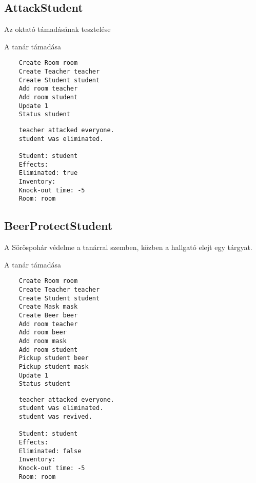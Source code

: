 \subsection{AttackStudent}
\begin{test-case-description}
    Az oktató támadásának tesztelése
\end{test-case-description}
\begin{test-case-function}
    A tanár támadása
\end{test-case-function}
\begin{test-case-input}
    \begin{verbatim}
    Create Room room
    Create Teacher teacher
    Create Student student
    Add room teacher
    Add room student
    Update 1
    Status student
    \end{verbatim}
\end{test-case-input}
\begin{test-case-output}
    \begin{verbatim}
    teacher attacked everyone.
    student was eliminated.
    
    Student: student
    Effects: 
    Eliminated: true
    Inventory: 
    Knock-out time: -5
    Room: room
    \end{verbatim}
\end{test-case-output}

\subsection{BeerProtectStudent}
\begin{test-case-description}
    A Söröspohár védelme a tanárral szemben, közben a hallgató elejt egy tárgyat.
\end{test-case-description}
\begin{test-case-function}
    A tanár támadása
\end{test-case-function}
\begin{test-case-input}
    \begin{verbatim}
    Create Room room
    Create Teacher teacher
    Create Student student
    Create Mask mask
    Create Beer beer
    Add room teacher
    Add room beer
    Add room mask
    Add room student
    Pickup student beer
    Pickup student mask
    Update 1
    Status student
    \end{verbatim}
\end{test-case-input}
\begin{test-case-output}
    \begin{verbatim}
    teacher attacked everyone.
    student was eliminated.
    student was revived.
    
    Student: student
    Effects: 
    Eliminated: false
    Inventory: 
    Knock-out time: -5
    Room: room
    \end{verbatim}
\end{test-case-output}

